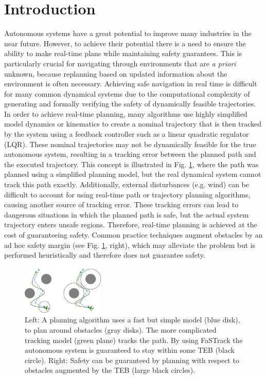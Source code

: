 \section{Introduction}

Autonomous systems have a great potential to improve many industries in the near future. However, to achieve their potential there is a need to ensure the ability to make real-time plans while maintaining safety guarantees.
This is particularly crucial for navigating through environments that are \textit{a priori} unknown, because replanning based on updated information about the environment is often necessary. 
Achieving safe navigation in real time is difficult for many common dynamical systems due to the computational complexity of generating and formally verifying the safety of dynamically feasible trajectories.
 In order to achieve real-time planning, many algorithms use highly simplified model dynamics or kinematics to create a nominal trajectory that is then tracked by the system using a feedback controller such as a linear quadratic regulator (LQR).  These nominal trajectories may not be dynamically feasible for the true autonomous system, resulting in a tracking error between the planned path and the executed trajectory.
 This concept is illustrated in Fig. \ref{fig:chasing}, where the path was planned using a simplified planning model, but the real dynamical system cannot track this path exactly. 
Additionally, external disturbances (e.g. wind) can be difficult to account for using real-time path or trajectory planning algorithms, causing another source of tracking error. 
These tracking errors can lead to dangerous situations in which the planned path is safe, but the actual system trajectory enters unsafe regions.  Therefore, real-time planning is achieved at the cost of guaranteeing safety.  Common practice techniques augment obstacles by an ad hoc safety margin (see Fig. \ref{fig:chasing}, right), which may alleviate the problem but is performed heuristically and therefore does not guarantee safety.
 \begin{figure}
 	\centering
 	\includegraphics[width=0.35\textwidth]{fig/chasing}
 	\caption{Left: A planning algorithm uses a fast but simple model (blue disk), to plan around obstacles (gray disks). The more complicated tracking model (green plane) tracks the path. By using FaSTrack the autonomous system is guaranteed to stay within some TEB (black circle). Right: Safety can be guaranteed by planning with respect to obstacles augmented by the TEB (large black circles).}
 	\label{fig:chasing}
 \end{figure}
